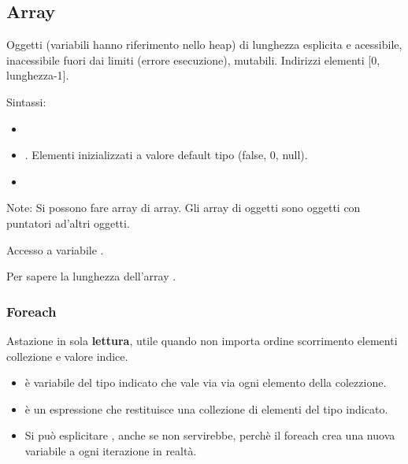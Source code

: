 \subsection{Array}
Oggetti (variabili hanno riferimento nello heap) di lunghezza esplicita e acessibile, inacessibile fuori dai limiti (errore esecuzione), mutabili. Indirizzi elementi [0, lunghezza-1].

Sintassi:
\begin{itemize}
	\item {}
	\item {}. Elementi inizializzati a valore default tipo (false, 0, null).
	\item {}
\end{itemize}

Note: Si possono fare array di array. Gli array di oggetti sono oggetti con puntatori ad'altri oggetti.

Accesso a variabile .

Per sapere la lunghezza dell'array .

\subsubsection{Foreach}
Astazione  in sola \textbf{lettura}, utile quando non importa ordine scorrimento elementi collezione e valore indice.


\begin{itemize}
	\item {} è variabile del tipo indicato che vale via via ogni elemento della colezzione.
	\item {} è un espressione che restituisce una collezione di elementi del tipo indicato.
	\item Si può esplicitare , anche se non servirebbe, perchè il foreach crea una nuova variabile a ogni iterazione in realtà.
\end{itemize}